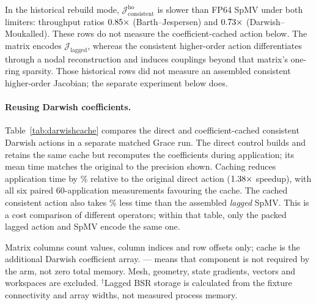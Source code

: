 \documentclass[sigconf,nonacm]{acmart}
\newcommand{\Jlag}{\mathcal{J}_{\mathrm{lagged}}}
\newcommand{\Jhoex}{\mathcal{J}^{\mathrm{ho}}_{\mathrm{consistent}}}
\begin{document}
In the historical rebuild mode, $\Jhoex$ is slower than FP64
SpMV under both limiters: throughput ratios $0.85\times$
(Barth--Jespersen) and $0.73\times$ (Darwish--Moukalled).
These rows do not measure the coefficient-cached action below. The matrix
encodes $\Jlag$, whereas the consistent higher-order action differentiates
through a nodal reconstruction and induces couplings beyond that matrix's
one-ring sparsity. Those historical rows did not measure an assembled consistent
higher-order Jacobian; the separate experiment below does.

\paragraph{Reusing Darwish coefficients.}
Table~\ref{tab:darwishcache} compares the direct and coefficient-cached consistent
Darwish actions in a separate matched Grace run. The direct control builds and
retains the same cache but recomputes the coefficients during application;
its mean time matches the original to the precision shown.
Caching reduces application time by \dcTimeReduction\% relative to the original
direct action ($1.38\times$ speedup), with all six paired 60-application measurements
favouring the cache. The cached consistent action also takes \dcSpmvReduction\%
less time than the assembled \emph{lagged} SpMV. This is a cost comparison of
different operators; within that table, only the packed lagged action and SpMV
encode the same one.

\begin{table}[t]
  \centering
  \small
  \caption{Matched FP64 application times on 72 Grace cores: affine interior,
    $n=128$, pack size 1024, Rhie--Chow enabled, state perturbation 0.017.
    Means and full sample ranges from six 60-application windows per arm;
    ranges are not confidence intervals. Every arm includes direction-gradient
    work where required; setup, assembly, checks and warmups are excluded.}
  \label{tab:darwishcache}
  
\par\smallskip\footnotesize Matrix columns count values, column indices and row offsets only; cache is the additional Darwish coefficient array. --- means that component is not required by the arm, not zero total memory. Mesh, geometry, state gradients, vectors and workspaces are excluded. $^{\dagger}$Lagged BSR storage is calculated from the fixture connectivity and array widths, not measured process memory.
\end{table}
\end{document}
